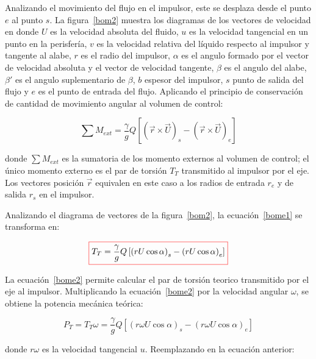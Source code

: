 \documentclass[11pt, oneside]{article}
\begin{document}
Analizando el movimiento del flujo en el impulsor, este se desplaza desde el punto $e$ al punto $s$. La figura~\ref{bom2} muestra los diagramas de los vectores de velocidad en donde $U$ es la velocidad absoluta del fluido, $u$ es la velocidad tangencial en un punto en la perisfer\'ia, $v$ es la velocidad relativa del l\'iquido respecto al impulsor y tangente al alabe, $r$ es el radio del impulsor, $\alpha$ es el angulo formado por el vector de velocidad absoluta y el vector de velocidad tangente, $\beta$ es el angulo del alabe, $\beta'$ es el angulo suplementario de $\beta$, $b$ espesor del impulsor, $s$ punto de salida del flujo y $e$ es el punto de entrada del flujo. Aplicando el principio de conservaci\'on de cantidad de movimiento angular al volumen de control:

\begin{equation}
\sum M_{ext} = \frac{\gamma}{g} Q \left[ \left( \vec{r} \times \vec{U}\right)_{s} -  \left( \vec{r} \times \vec{U}\right)_{e} \right]
\label{bome1}
\end{equation}

donde $\sum M_{ext}$ es la sumatoria de los momento externos al volumen de control; el \'unico momento externo es el par de torsi\'on $T_T$ transmitido al impulsor por el eje. Los vectores posici\'on $\vec{r}$ equivalen en este caso a los radios de entrada $r_e$ y de salida $r_s$ en el impulsor. 

Analizando el diagrama de vectores de la figura~\ref{bom2}, la ecuaci\'on~\ref{bome1} se transforma en:

\begin{equation}
\color{red}\boxed{\color{black} T_T = \frac{\gamma}{g} Q \left[ \left( r U \cos \alpha \right)_{s} -  \left(r U \cos \alpha  \right)_{e} \right] }
\label{bome2}
\end{equation}

La ecuaci\'on~\ref{bome2} permite calcular el par de torsi\'on teorico transmitido por el eje al impulsor. Multiplicando la ecuaci\'on~\ref{bome2} por la velocidad angular $\omega$, se obtiene la potencia mec\'anica te\'orica:

\begin{equation}
P_T = T_T \omega = \frac{\gamma}{g} Q \left[ \left( r \omega U \cos \alpha \right)_{s} -  \left(r \omega U  \cos \alpha  \right)_{e} \right]
\label{bome3}
\end{equation}

donde $r\omega$ es la velocidad tangencial $u$. Reemplazando en la ecuaci\'on anterior:
\end{document}
